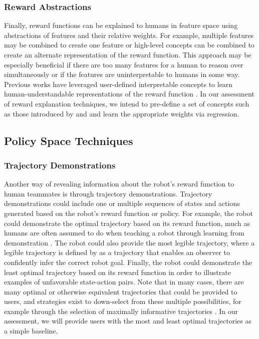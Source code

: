 \documentclass[letterpaper]{article} %
\begin{document}
\subsubsection{Reward Abstractions}
Finally, reward functions can be explained to humans in feature space using abstractions of features and their relative weights. For example, multiple features may be combined to create one feature or high-level concepts can be combined to create an alternate representation of the reward function. This approach may be especially beneficial if there are too many features for a human to reason over simultaneously or if the features are uninterpretable to humans in some way. Previous works have leveraged user-defined interpretable concepts to learn human-understandable representations of the reward function \cite{lage2020human, sreedharan2020bridging}. In our assessment of reward explanation techniques, we intend to pre-define a set of concepts such as those introduced by \citet{lage2020human} and \citet{sreedharan2020bridging} and learn the appropriate weights via regression.



\subsection{Policy Space Techniques}

\subsubsection{Trajectory Demonstrations}
Another way of revealing information about the robot's reward function to human teammates is through trajectory demonstrations. Trajectory demonstrations could include one or multiple sequences of states and actions generated based on the robot's reward function or policy. For example, the robot could demonstrate the optimal trajectory based on its reward function, much as humans are often assumed to do when teaching a robot through learning from demonstration \cite{argall2009survey}. The robot could also provide the most legible trajectory, where a legible trajectory is defined by \citet{dragan2013legibility} as a trajectory that enables an observer to confidently infer the correct robot goal. Finally, the robot could demonstrate the least optimal trajectory based on its reward function in order to illustrate examples of unfavorable state-action pairs. Note that in many cases, there are many optimal or otherwise equivalent trajectories that could be provided to users, and strategies exist to down-select from these multiple possibilities, for example through the selection of maximally informative trajectories \cite{huang2019enabling, lee2021machine, cakmak2012algorithmic}. In our assessment, we will provide users with the most and least optimal trajectories as a simple baseline.
\end{document}
